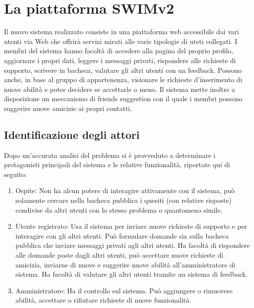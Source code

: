 \documentclass[a4paper,12pt]{article}
\begin{document}
\clearpage

\section{La piattaforma SWIMv2}
Il nuovo sistema realizzato consiste in una piattaforma web accessibile dai vari utenti via Web che offrirà servizi mirati alle varie tipologie di uteti collegati.
I membri del sistema hanno facoltà di accedere alla pagina del proprio profilo, aggiornare i propri dati, leggere i messaggi privati, rispondere alle richieste di supporto, scrivere in bacheca, valutare gli altri utenti con un feedback. Possono anche, in base al gruppo di appartenenza, visionare le richieste d’inserimento di nuove abilità e poter decidere se accettarle o meno.
Il sistema mette inoltre a disposizione un meccanismo di friends suggestion con il quale i membri possono suggerire nuove amicizie ai propri contatti.
\subsection{Identificazione degli attori}
Dopo un’accurata analisi del problema si è provveduto a determinare i protagonisti principali del sistema e le relative funzionalità, riportate qui di seguito:
\begin{enumerate}
\item Ospite: Non ha alcun potere di interagire attivamente con il sistema, può solamente cercare nella bacheca pubblica i quesiti (con relative risposte) condivise da altri utenti con lo stesso problema o quantomeno simile.
\item Utente registrato: Usa il sistema per inviare nuove richieste di supporto e per interagire con gli altri utenti. Può formulare domande sia sulla bacheca pubblica che inviare messaggi privati agli altri utenti. Ha facoltà di rispondere alle domande poste dagli altri utenti, può accettare nuove richieste di amicizia, inviarne di nuove e suggerire nuove abilità all’amministratore di sistema. Ha facoltà di valutare gli altri utenti tramite un sistema di feedback.
\item Amministratore: Ha il controllo sul sistema. Può aggiungere o rimuovere abilità, accettare o rifiutare richieste di nuove funzionalità.
\end{enumerate}

\clearpage
\end{document}
